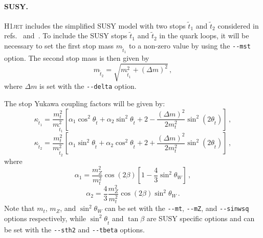 \documentclass[12pt]{article}
\begin{document}
\paragraph{SUSY.} \textsc{H1jet} includes the simplified SUSY model with
two stops $\tilde{t}_1$ and $\tilde{t}_2$ considered in refs.~\cite{Gunion:2002zf} and~\cite{Banfi:2018pki}. To include the SUSY stops $\tilde{t}_1$ and
$\tilde{t}_2$ in the quark loops, it will be necessary to set the
first stop mass $m_{\tilde{t}_1}$ to a non-zero value by using the
\texttt{-{}-mst} option. The second stop mass is then given by
\begin{equation}
	m_{\tilde{t}_2} = \sqrt{m_{\tilde{t}_1}^2 + (\Delta m)^2} \,,
\end{equation}
where $\Delta m$ is set with the \texttt{-{}-delta} option. 

The stop Yukawa coupling factors will be given by: 
\begin{equation}
   \kappa_{\tilde{t}_1} = \frac{m_t^2}{m_{\tilde{t}_1}^2} \left [ \alpha_1 \cos^2 \theta_{\tilde{t}} + \alpha_2 \sin^2 \theta_{\tilde{t}} + 2 - \frac{(\Delta m)^2}{2 m_t^2} \sin^2\left ( 2 \theta_{\tilde{t}} \right ) \right ] \,,
\end{equation} 
\begin{equation}
   \kappa_{\tilde{t}_2} = \frac{m_t^2}{m_{\tilde{t}_2}^2} \left [ \alpha_1 \sin^2 \theta_{\tilde{t}} + \alpha_2 \cos^2 \theta_{\tilde{t}} + 2 + \frac{(\Delta m)^2}{2 m_t^2} \sin^2\left ( 2 \theta_{\tilde{t}} \right ) \right ] \,, 
\end{equation} 
where 
\begin{equation}
   \alpha_1 = \frac{m_Z^2}{m_t^2} \cos \left ( 2 \beta \right ) \left [ 1 - \frac{4}{3} \sin^2\theta_W \right ] \,, 
\end{equation} 
\begin{equation}
   \alpha_2 = \frac{4}{3} \frac{m_Z^2}{m_t^2} \cos \left ( 2 \beta \right ) \sin^2\theta_W \,. 
\end{equation} 
Note that $m_t$, $m_Z$, and $\sin^2\theta_W$ can be set with the \texttt{-{}-mt}, \texttt{-{}-mZ}, and \texttt{-{}-sinwsq} options respectively, while $\sin^2 \theta_{\tilde{t}}$ and $\tan\beta$ are SUSY specific options and can be set with the \texttt{-{}-sth2} and \texttt{-{}-tbeta} options. 
\end{document}
